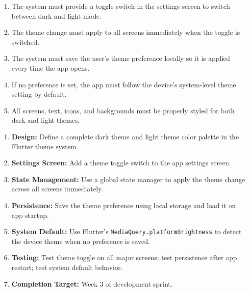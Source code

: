 \documentclass[12pt,a4paper]{article}
\begin{document}
\begin{tcolorbox}[frbox, title={Functional Requirements --- PUC-12}]
\begin{enumerate}[leftmargin=*, label=\textbf{FR-12.\arabic*}, itemsep=5pt]
  \item The system must provide a toggle switch in the settings screen to switch between dark and light mode.
  \item The theme change must apply to all screens immediately when the toggle is switched.
  \item The system must save the user's theme preference locally so it is applied every time the app opens.
  \item If no preference is set, the app must follow the device's system-level theme setting by default.
  \item All screens, text, icons, and backgrounds must be properly styled for both dark and light themes.
\end{enumerate}
\end{tcolorbox}

\begin{tcolorbox}[planbox, title={Completion Plan --- PUC-12}]
\begin{enumerate}[leftmargin=*, label=\textbf{Step \arabic*:}, itemsep=4pt]
  \item \textbf{Design:} Define a complete dark theme and light theme color palette in the Flutter theme system.
  \item \textbf{Settings Screen:} Add a theme toggle switch to the app settings screen.
  \item \textbf{State Management:} Use a global state manager to apply the theme change across all screens immediately.
  \item \textbf{Persistence:} Save the theme preference using local storage and load it on app startup.
  \item \textbf{System Default:} Use Flutter's \texttt{MediaQuery.platformBrightness} to detect the device theme when no preference is saved.
  \item \textbf{Testing:} Test theme toggle on all major screens; test persistence after app restart; test system default behavior.
  \item \textbf{Completion Target:} Week 3 of development sprint.
\end{enumerate}
\end{tcolorbox}

\newpage
\end{document}
